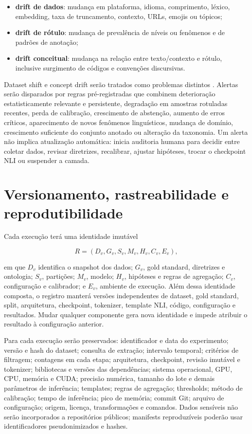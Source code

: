 \begin{itemize}
\item \textbf{drift de dados}: mudança em plataforma, idioma, comprimento, léxico, embedding, taxa de truncamento, contexto, URLs, emojis ou tópicos;
\item \textbf{drift de rótulo}: mudança de prevalência de níveis ou fenômenos e de padrões de anotação;
\item \textbf{drift conceitual}: mudança na relação entre texto/contexto e rótulo, inclusive surgimento de códigos e convenções discursivas.
\end{itemize}

Dataset shift e concept drift serão tratados como problemas distintos \cite{quinonerocandela2009,gama2014}. Alertas serão disparados por regras pré-registradas que combinem deterioração estatisticamente relevante e persistente, degradação em amostras rotuladas recentes, perda de calibração, crescimento de abstenção, aumento de erros críticos, aparecimento de novos fenômenos linguísticos, mudança de domínio, crescimento suficiente do conjunto anotado ou alteração da taxonomia. Um alerta não implica atualização automática: inicia auditoria humana para decidir entre coletar dados, revisar diretrizes, recalibrar, ajustar hipóteses, trocar o checkpoint NLI ou suspender a camada.

\section{Versionamento, rastreabilidade e reprodutibilidade}

Cada execução terá uma identidade imutável

\[
R=(D_v,G_v,S_v,M_v,H_v,C_v,E_v),
\]

em que \(D_v\) identifica o snapshot dos dados; \(G_v\), gold standard, diretrizes e ontologia; \(S_v\), partições; \(M_v\), modelo; \(H_v\), hipóteses e regras de agregação; \(C_v\), configuração e calibrador; e \(E_v\), ambiente de execução. Além dessa identidade composta, o registro manterá versões independentes de dataset, gold standard, split, arquitetura, checkpoint, tokenizer, template NLI, código, configuração e resultados. Mudar qualquer componente gera nova identidade e impede atribuir o resultado à configuração anterior.

Para cada execução serão preservados: identificador e data do experimento; versão e hash do dataset; consulta de extração; intervalo temporal; critérios de filtragem; contagens em cada etapa; arquitetura, checkpoint, revisão imutável e tokenizer; bibliotecas e versões das dependências; sistema operacional, GPU, CPU, memória e CUDA; precisão numérica, tamanho do lote e demais parâmetros de inferência; templates; regras de agregação; thresholds; método de calibração; tempo de inferência; pico de memória; commit Git; arquivo de configuração; origem, licença, transformações e comandos. Dados sensíveis não serão incorporados a repositórios públicos; manifests reproduzíveis poderão usar identificadores pseudonimizados e hashes.


